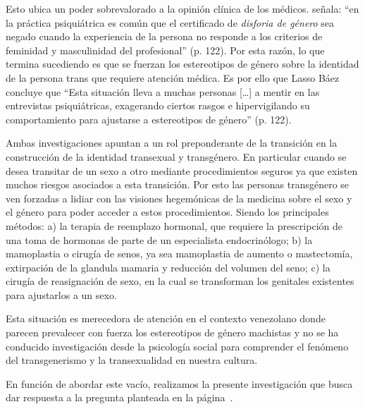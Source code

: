 Esto ubica un poder sobrevalorado a la opinión clínica de los médicos.
\textcite{LassoBaez2014} señala: “en la práctica psiquiátrica es común que el
certificado de \emph{disforia de género} sea negado cuando la experiencia de la
persona no responde a los criterios de feminidad y masculinidad del profesional”
(p. 122). Por esta razón, lo que termina sucediendo es que se fuerzan los
estereotipos de género sobre la identidad de la persona trans que requiere
atención médica. Es por ello que Lasso Báez concluye que “Esta situación lleva a
muchas personas […] a mentir en las entrevistas psiquiátricas, exagerando
ciertos rasgos e hipervigilando su comportamiento para ajustarse a estereotipos
de género” (p. 122).

Ambas investigaciones apuntan a un rol preponderante de la
transición en la construcción de la identidad transexual y transgénero.
En particular cuando se desea transitar de un sexo a otro mediante
procedimientos seguros ya que existen muchos riesgos asociados a esta
transición. Por esto las personas transgénero se ven forzadas a lidiar con las
visiones hegemónicas de la medicina sobre el sexo y el género para poder acceder
a estos procedimientos. Siendo los principales métodos: a) la terapia de
reemplazo hormonal, que requiere la prescripción de una toma de hormonas de
parte de un especialista endocrinólogo; b) la mamoplastia o cirugía de senos, ya
sea mamoplastia de aumento o mastectomía, extirpación de la glandula mamaria y
reducción del volumen del seno; c) la cirugía de reasignación de sexo, en la
cual se transforman los genitales existentes para ajustarlos a un sexo.

Esta situación es merecedora de atención en el contexto venezolano donde parecen
prevalecer con fuerza los estereotipos de género machistas y no se ha conducido
investigación desde la psicología social para comprender el fenómeno del
transgenerismo y la transexualidad en nuestra cultura.

En función de abordar este vacío, realizamos la presente investigación que busca
dar respuesta a la pregunta planteada en la página~\pageref{preguntas}.


